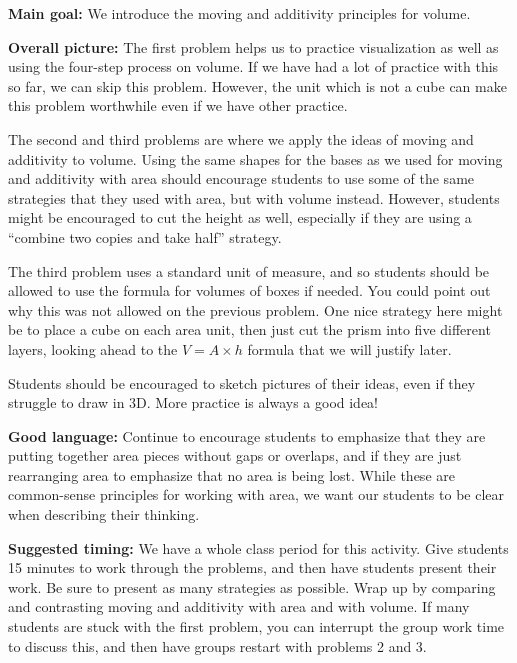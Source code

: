 \documentclass[noauthor,nooutcomes, handout]{ximera}
\begin{document}
\begin{instructorNotes}
{\bf Main goal:} We introduce the moving and additivity principles for volume.

{\bf Overall picture:} 
The first problem helps us to practice visualization as well as using the four-step process on volume. If we have had a lot of practice with this so far, we can skip this problem. However, the unit which is not a cube can make this problem worthwhile even if we have other practice.

The second and third problems are where we apply the ideas of moving and additivity to volume. Using the same shapes for the bases as we used for moving and additivity with area should encourage students to use some of the same strategies that they used with area, but with volume instead. However, students might be encouraged to cut the height as well, especially if they are using a ``combine two copies and take half'' strategy.

The third problem uses a standard unit of measure, and so students should be allowed to use the formula for volumes of boxes if needed. You could point out why this was not allowed on the previous problem. One nice strategy here might be to place a cube on each area unit, then just cut the prism into five different layers, looking ahead to the $V = A \times h$ formula that we will justify later.

Students should be encouraged to sketch pictures of their ideas, even if they struggle to draw in 3D. More practice is always a good idea!



{\bf Good language:} Continue to encourage students to emphasize that they are putting together area pieces without gaps or overlaps, and if they are just rearranging area to emphasize that no area is being lost. While these are common-sense principles for working with area, we want our students to be clear when describing their thinking.



{\bf Suggested timing:} We have a whole class period for this activity. Give students 15 minutes to work through the problems, and then have students present their work. Be sure to present as many strategies as possible. Wrap up by comparing and contrasting moving and additivity with area and with volume. If many students are stuck with the first problem, you can interrupt the group work time to discuss this, and then have groups restart with problems 2 and 3.
\end{instructorNotes}
\end{document}
